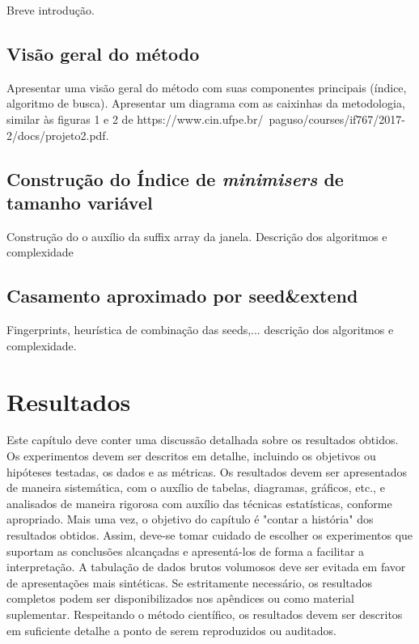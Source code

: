 \documentclass[bsc, oneside, scr, 12pt]{ufpethesis}
\newenvironment{comment}{\itshape\noindent<begin comment -- ommit this in the final version>\par}{\par\noindent<end comment>\rm}
\newcommand{\minimisers}{\textit{minimisers}\/\xspace}
\begin{document}
Breve introdução.

\section{Visão geral do método}

Apresentar uma visão geral do método com suas componentes principais (índice, algoritmo de busca). Apresentar um diagrama com as caixinhas da metodologia, similar às figuras 1 e 2 de https://www.cin.ufpe.br/~paguso/courses/if767/2017-2/docs/projeto2.pdf.

\section{Construção do Índice de \minimisers de tamanho variável}

Construção do o auxílio da suffix array da janela.
Descrição dos algoritmos e complexidade


\section{Casamento aproximado por seed\&extend}

Fingerprints, heurística de combinação das seeds,... descrição dos algoritmos e complexidade.



\chapter{Resultados}

\begin{comment}
	Este capítulo deve conter uma discussão detalhada sobre os resultados obtidos. Os experimentos devem ser descritos em detalhe, incluindo os objetivos ou hipóteses testadas, os dados e as métricas. Os resultados devem ser apresentados de maneira sistemática, com o auxílio de tabelas, diagramas, gráficos, etc., e analisados de maneira rigorosa com auxílio das técnicas estatísticas, conforme apropriado. Mais uma vez, o objetivo do capítulo é "contar a história" dos resultados obtidos. Assim, deve-se tomar cuidado de escolher os experimentos que suportam as conclusões alcançadas e apresentá-los de forma a facilitar a interpretação. A tabulação de dados brutos volumosos deve ser evitada em favor de apresentações mais sintéticas. Se estritamente necessário, os resultados completos podem ser disponibilizados nos apêndices ou como material suplementar. Respeitando o método científico, os resultados devem ser descritos em suficiente detalhe a ponto de serem reproduzidos ou auditados.
\end{comment}
\end{document}
